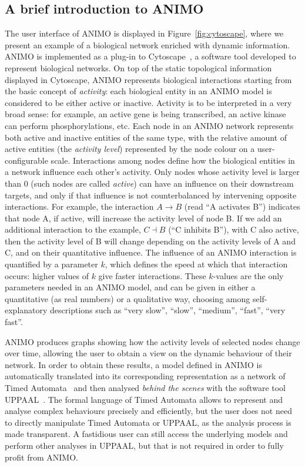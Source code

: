 \documentclass{bmcart}
\begin{document}
\subsection*{A brief introduction to ANIMO}
The user interface of ANIMO is displayed in Figure~\ref{fig:cytoscape},
where we present an example of a biological network enriched with dynamic information.
ANIMO is implemented as a plug-in to Cytoscape~\cite{cytoscape}, a software tool developed to represent biological networks.
On top of the static topological information displayed in Cytoscape, ANIMO represents
biological interactions starting from the basic concept of \emph{activity}:
each biological entity in an ANIMO model is considered to be either active or inactive.
Activity is to be interpreted in a very broad sense: for example, an active gene is being transcribed,
an active kinase can perform phosphorylations, etc. Each node in an ANIMO network represents
both active and inactive entities of the same type, with the relative amount of active entities
(the \emph{activity level}) represented by the node colour on a user-configurable scale.
Interactions among nodes define how the biological entities in a network influence each other's activity.
Only nodes whose activity level is larger than 0 (such nodes are called \emph{active}) can have an 
influence on their downstream targets, and only if that influence is not counterbalanced by intervening opposite interactions.
For example, the interaction $A\rightarrow B$ (read ``A activates B'') indicates that node A, if active,
will increase the activity level of node B. If we add an additional interaction to the example,
$C \dashv$\hspace{0.1em}$B$ (``C inhibits B''), with C also active, then the activity level of B will change depending on the
activity levels of A and C, and on their quantitative influence.
The influence of an ANIMO interaction is quantified by a parameter $k$, which defines the speed at which
that interaction occurs: higher values of $k$ give faster interactions. These $k$-values are
the only parameters needed in an ANIMO model, and can be given in either
a quantitative (as real numbers) or a qualitative way, choosing among self-explanatory descriptions
such as ``very slow'', ``slow'', ``medium'', ``fast'', ``very fast''.





ANIMO produces graphs showing how the activity levels of selected nodes
change over time, allowing the user to obtain a view on the dynamic behaviour of their network.
In order to obtain these results, a model defined in ANIMO is automatically translated into
its corresponding representation as a network of Timed Automata~\cite{timed-automata-alur-dill}
and then analysed \emph{behind the scenes} with the software tool UPPAAL~\cite{uppaal}.
The formal language of Timed Automata allows to represent and analyse complex behaviours precisely and efficiently,
but the user does not need to directly manipulate Timed Automata or UPPAAL, as the analysis process is made transparent.
A fastidious user can still access the underlying models and perform other analyses in UPPAAL,
but that is not required in order to fully profit from ANIMO.
\end{document}
